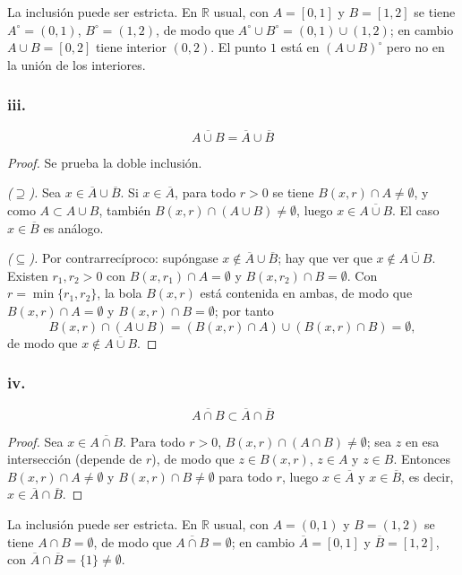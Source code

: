 \documentclass[11pt, a4paper]{article}
\begin{document}
La inclusión puede ser estricta. En $\mathbb{R}$ usual, con $A = [0, 1]$ y $B = [1, 2]$ se tiene
$A^\circ = (0, 1)$, $B^\circ = (1, 2)$, de modo que $A^\circ \cup B^\circ = (0, 1) \cup (1, 2)$; en
cambio $A \cup B = [0, 2]$ tiene interior $(0, 2)$. El punto $1$ está en $(A \cup B)^\circ$ pero no
en la unión de los interiores.

\subsubsection*{iii.}
$$ \overline{A \cup B} = \overline{A} \cup \overline{B} $$

\begin{proof}
Se prueba la doble inclusión.

\textit{($\supseteq$).} Sea $x \in \overline{A} \cup \overline{B}$. Si $x \in \overline{A}$, para
todo $r > 0$ se tiene $B(x, r) \cap A \neq \emptyset$, y como $A \subset A \cup B$, también
$B(x, r) \cap (A \cup B) \neq \emptyset$, luego $x \in \overline{A \cup B}$. El caso
$x \in \overline{B}$ es análogo.

\textit{($\subseteq$).} Por contrarrecíproco: supóngase $x \notin \overline{A} \cup \overline{B}$;
hay que ver que $x \notin \overline{A \cup B}$. Existen $r_1, r_2 > 0$ con $B(x, r_1) \cap A =
\emptyset$ y $B(x, r_2) \cap B = \emptyset$. Con $r = \min\{r_1, r_2\}$, la bola $B(x, r)$ está
contenida en ambas, de modo que $B(x, r) \cap A = \emptyset$ y $B(x, r) \cap B = \emptyset$; por tanto
$$ B(x, r) \cap (A \cup B) = (B(x, r) \cap A) \cup (B(x, r) \cap B) = \emptyset, $$
de modo que $x \notin \overline{A \cup B}$.
\end{proof}

\subsubsection*{iv.}
$$ \overline{A \cap B} \subset \overline{A} \cap \overline{B} $$

\begin{proof}
Sea $x \in \overline{A \cap B}$. Para todo $r > 0$, $B(x, r) \cap (A \cap B) \neq \emptyset$; sea
$z$ en esa intersección (depende de $r$), de modo que $z \in B(x, r)$, $z \in A$ y $z \in B$.
Entonces $B(x, r) \cap A \neq \emptyset$ y $B(x, r) \cap B \neq \emptyset$ para todo $r$, luego
$x \in \overline{A}$ y $x \in \overline{B}$, es decir, $x \in \overline{A} \cap \overline{B}$.
\end{proof}

La inclusión puede ser estricta. En $\mathbb{R}$ usual, con $A = (0, 1)$ y $B = (1, 2)$ se tiene
$A \cap B = \emptyset$, de modo que $\overline{A \cap B} = \emptyset$; en cambio $\overline{A} = [0, 1]$
y $\overline{B} = [1, 2]$, con $\overline{A} \cap \overline{B} = \{1\} \neq \emptyset$.
\end{document}
